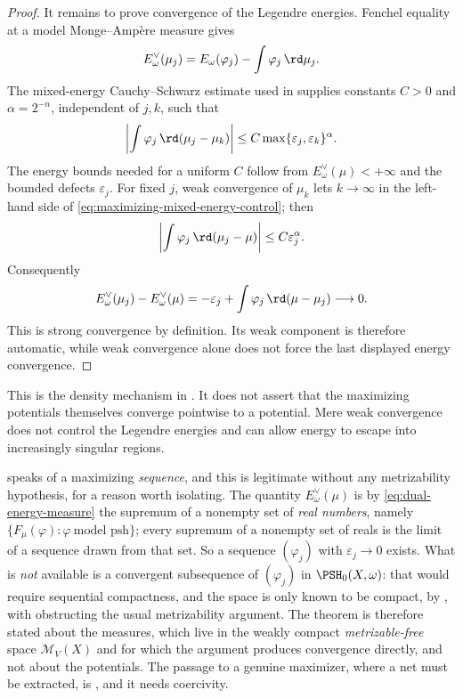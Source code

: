 \begin{proof}
It remains to prove convergence of the Legendre energies.  Fenchel equality
at a model Monge--Amp\`ere measure gives
\[
 E_\omega^\vee(\mu_j)
 =E_\omega(\varphi_j)-\int\varphi_j\,\rd\mu_j.
\]
The mixed-energy Cauchy--Schwarz estimate used in
 supplies constants
$C>0$ and $\alpha=2^{-n}$, independent of $j,k$, such that
\begin{equation}\label{eq:maximizing-mixed-energy-control}
 \left|\int\varphi_j\,\rd(\mu_j-\mu_k)\right|
 \leq C\max\{\varepsilon_j,\varepsilon_k\}^{\alpha}.
\end{equation}
The energy bounds needed for a uniform $C$ follow from
$E_\omega^\vee(\mu)<+\infty$ and the bounded defects
$\varepsilon_j$.  For fixed $j$, weak convergence of $\mu_k$ lets
$k\to\infty$ in the left-hand side of
\eqref{eq:maximizing-mixed-energy-control}; then
\[
 \left|\int\varphi_j\,\rd(\mu_j-\mu)\right|
 \leq C\varepsilon_j^\alpha.
\]
Consequently
\[
 E_\omega^\vee(\mu_j)-E_\omega^\vee(\mu)
 =-\varepsilon_j+
   \int\varphi_j\,\rd(\mu-\mu_j)\longrightarrow0.
\]
This is strong convergence by definition.  Its weak component is therefore
automatic, while weak convergence alone does not force the last displayed
energy convergence.
\end{proof}

This is the density mechanism in
.  It does not assert that
the maximizing potentials themselves converge pointwise to a potential.
Mere weak convergence does not control the Legendre energies and can allow
energy to escape into increasingly singular regions.

\begin{remark}
\label{rem:ch28-maximizing-sequence-exists}
 speaks of a maximizing
\emph{sequence}, and this is legitimate without any metrizability
hypothesis, for a reason worth isolating.  The quantity
\(E^\vee_\omega(\mu)\) is by \eqref{eq:dual-energy-measure} the supremum of a
nonempty set of \emph{real numbers}, namely
\(\{F_\mu(\varphi):\varphi\ \text{model psh}\}\); every supremum of a
nonempty set of reals is the limit of a sequence drawn from that set.  So a
sequence \((\varphi_j)\) with \(\varepsilon_j\to0\) exists.  What is
\emph{not} available is a convergent subsequence of \((\varphi_j)\) in
\(\PSH_0(X,\omega)\): that would require sequential compactness, and the
space is only known to be compact, by , with
 obstructing the usual metrizability
argument.  The theorem is therefore stated about the measures, which live in
the weakly compact \emph{metrizable-free} space \(\mathcal M_V(X)\) and for
which the argument produces convergence directly, and not about the
potentials.  The passage to a genuine maximizer, where a net must be
extracted, is , and it needs coercivity.
\end{remark}

